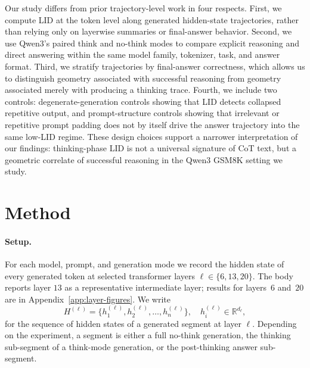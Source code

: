 \documentclass{article}
\theoremstyle{plain}
\theoremstyle{definition}
\theoremstyle{remark}
\begin{document}
Our study differs from prior trajectory-level work in four respects. First, we compute LID at the token level along generated hidden-state trajectories, rather than relying only on layerwise summaries or final-answer behavior. Second, we use Qwen3's paired think and no-think modes to compare explicit reasoning and direct answering within the same model family, tokenizer, task, and answer format. Third, we stratify trajectories by final-answer correctness, which allows us to distinguish geometry associated with successful reasoning from geometry associated merely with producing a thinking trace. Fourth, we include two controls: degenerate-generation controls showing that LID detects collapsed repetitive output, and prompt-structure controls showing that irrelevant or repetitive prompt padding does not by itself drive the answer trajectory into the same low-LID regime. These design choices support a narrower interpretation of our findings: thinking-phase LID is not a universal signature of CoT text, but a geometric correlate of successful reasoning in the Qwen3 GSM8K setting we study.

\section{Method}
\label{sec:method}

\paragraph{Setup.} For each model, prompt, and generation mode we record the hidden state of every generated token at selected transformer layers $\ell \in \{6, 13, 20\}$. The body reports layer $13$ as a representative intermediate layer; results for layers~$6$ and~$20$ are in Appendix~\ref{app:layer-figures}. We write
\[
H^{(\ell)} = \{h^{(\ell)}_1, h^{(\ell)}_2, \ldots, h^{(\ell)}_n\}, \quad h^{(\ell)}_i \in \mathbb{R}^{d_\ell},
\]
for the sequence of hidden states of a generated {segment} at layer $\ell$. Depending on the experiment, a segment is either a full no-think generation, the thinking sub-segment of a think-mode generation, or the post-thinking answer sub-segment.
\end{document}
